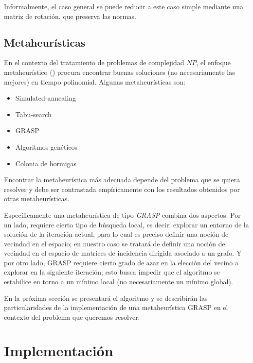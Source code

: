 \documentclass[conference,compsoc,a4paper]{IEEEtran}
\begin{document}
\smallskip

Informalmente, el caso general se puede reducir a este caso simple 
mediante una matriz de rotación, que preserva las normas.

\subsection{Metaheurísticas}

En el contexto del tratamiento de problemas de complejidad $NP$, el 
enfoque metaheurístico (\cite{GP:2010,Talbi:2009}) procura encontrar buenas soluciones (no 
necesariamente las mejores) en tiempo polinomial. Algunas 
metaheurísticas son:

\begin{itemize}
	\item Simulated-annealing
	\item Tabu-search
	\item GRASP
	\item Algoritmos genéticos
	\item Colonia de hormigas
\end{itemize}

Encontrar la metaheurística más adecuada depende del problema que se 
quiera resolver y debe ser contrastada empíricamente con los resultados 
obtenidos por otras metaheurísticas.

\smallskip

Específicamente una metaheurística de tipo \textit{GRASP} combina dos 
aspectos. Por un lado, requiere cierto tipo de búsqueda local, es decir: 
explorar un entorno de la solución de la iteración actual, para lo cual 
es preciso definir una noción de vecindad en el espacio; en nuestro caso 
se tratará de definir una noción de vecindad en el espacio de matrices 
de incidencia dirigida asociado a un grafo. Y por otro lado, GRASP 
requiere cierto grado de azar en la elección del vecino a explorar en 
la siguiente iteración; esto busca impedir que el algoritmo se 
estabilice en torno a un mínimo local (no necesariamente un mínimo 
global). 

\smallskip

En la próxima sección se presentará el algoritmo y se describirán las 
particularidades de la implementación de una metaheurística GRASP en el 
contexto del problema que queremos resolver.

\section{Implementación}
\end{document}
